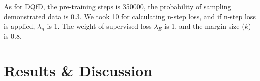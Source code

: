 \documentclass{article}
\begin{document}
As for DQfD, the pre-training steps is 350000, the probability of sampling demonstrated data is 0.3. We took 10 for calculating n-step loss, and if n-step loss is applied, $\lambda_n$ is 1. The weight of supervised loss $\lambda_E$ is 1, and the margin size ($k$) is 0.8.


\section{Results \& Discussion}



\renewcommand\refname{References}


\end{document}

